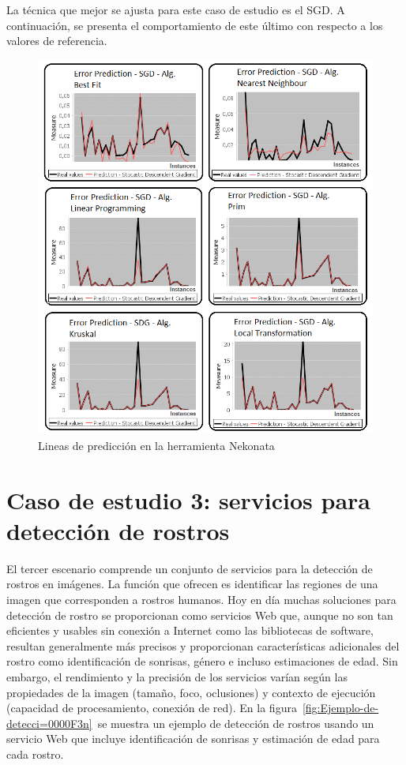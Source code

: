 La técnica que mejor se ajusta para este caso de estudio es el \ac{SGD}.\emph{
}A continuación, se presenta el comportamiento de este último con
respecto a los valores de referencia.

\begin{figure}[H]
\begin{centering}
\includegraphics[scale=0.4]{images/response_SGD_TSPLIB}
\par\end{centering}

\caption{Lineas de predicción en la herramienta Nekonata}
\end{figure}



\section{Caso de estudio 3: servicios para detección de rostros\label{subsec:Escenario-2:-Servicios}}

El tercer escenario comprende un conjunto de servicios para la detección
de rostros en imágenes. La función que ofrecen es identificar las
regiones de una imagen que corresponden a rostros humanos. Hoy en
día muchas soluciones para detección de rostro se proporcionan como
servicios Web que, aunque no son tan eficientes y usables sin conexión
a Internet como las bibliotecas de software, resultan generalmente
más precisos y proporcionan características adicionales del rostro
como identificación de sonrisas, género e incluso estimaciones de
edad. Sin embargo, el rendimiento y la precisión de los servicios
varían según las propiedades de la imagen (tamaño, foco, oclusiones)
y contexto de ejecución (capacidad de procesamiento, conexión de red).
En la figura~\ref{fig:Ejemplo-de-detecci=0000F3n}~se muestra un
ejemplo de detección de rostros usando un servicio Web que incluye
identificación de sonrisas y estimación de edad para cada rostro.

